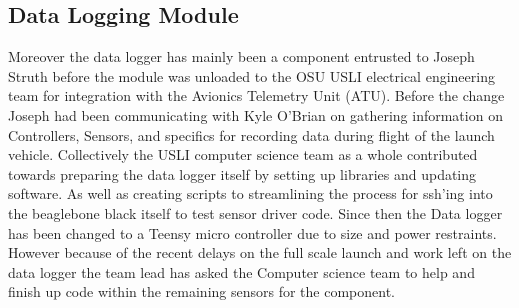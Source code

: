 \documentclass[onecolumn, draftclsnofoot,10pt, compsoc]{IEEEtran}
\begin{document}
\subsection{Data Logging Module}
Moreover the data logger has mainly been a component entrusted to Joseph Struth before the module was unloaded to the OSU USLI electrical engineering team for integration with the Avionics Telemetry Unit (ATU). Before the change Joseph had been communicating with Kyle O'Brian on gathering information on Controllers, Sensors, and specifics for recording data during flight of the launch vehicle. Collectively the USLI computer science team as a whole contributed towards preparing the data logger itself by setting up libraries and updating software. As well as creating scripts to streamlining the process for ssh'ing into the beaglebone black itself to test sensor driver code. Since then the Data logger has been changed to a Teensy micro controller due to size and power restraints. However because of the recent delays on the full scale launch and work left on the data logger the team lead has asked the Computer science team to help and finish up code within the remaining sensors for the component.\par
\end{document}
